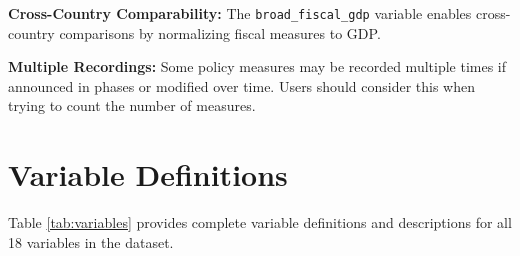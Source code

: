 \documentclass[12pt]{article}
\begin{document}
\textbf{Cross-Country Comparability:} The \texttt{broad\_fiscal\_gdp} variable enables cross-country comparisons by normalizing fiscal measures to GDP. 

\textbf{Multiple Recordings:} Some policy measures may be recorded multiple times if announced in phases or modified over time. Users should consider this when trying to count the number of measures.
\newpage
\section{Variable Definitions}

Table \ref{tab:variables} provides complete variable definitions and descriptions for all 18 variables in the dataset.
\end{document}
